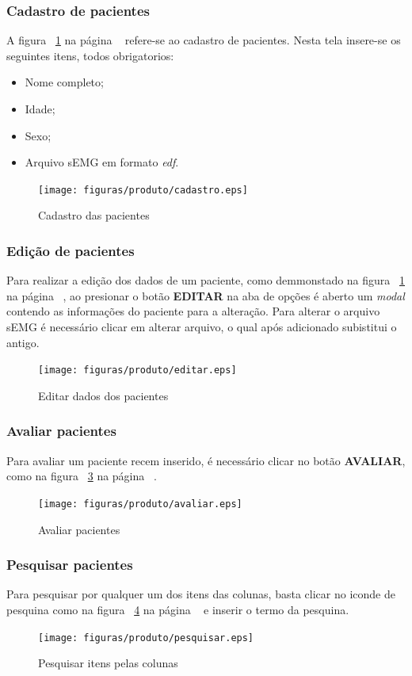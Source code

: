 \subsubsection{Cadastro de pacientes}
A figura ~\ref{figcadastro} na página ~\pageref{figcadastro} refere-se ao cadastro de pacientes. Nesta tela insere-se os seguintes itens, todos obrigatorios:
\begin{itemize}
	\item Nome completo;
	\item Idade;
	\item Sexo;
	\item Arquivo sEMG em formato \textit{edf}.
\end{itemize}

\begin{figure}[!htb]
	\centering
	\texttt{[image: figuras/produto/cadastro.eps]}
	\caption{Cadastro das pacientes}
	\label{figcadastro}
\end{figure}

\subsubsection{Edição de pacientes}
Para realizar a edição dos dados de um paciente, como demmonstado na figura ~\ref{figcadastro} na página ~\pageref{figcadastro}, ao presionar o botão \textbf{EDITAR} na aba de opções é aberto um \textit{modal} contendo as informações do paciente para a alteração. Para alterar o arquivo sEMG é necessário clicar em alterar arquivo, o qual após adicionado subistitui o antigo.

\begin{figure}[!htb]
	\centering
	\texttt{[image: figuras/produto/editar.eps]}
	\caption{Editar dados dos pacientes}
	\label{figeditar}
\end{figure}

\subsubsection{Avaliar pacientes}
Para avaliar um paciente recem inserido, é necessário clicar no botão \textbf{AVALIAR}, como na figura ~\ref{figavaliar} na página ~\pageref{figavaliar}.
\begin{figure}[!htb]
	\centering
	\texttt{[image: figuras/produto/avaliar.eps]}
	\caption{Avaliar pacientes}
	\label{figavaliar}
\end{figure}

\subsubsection{Pesquisar pacientes}
Para pesquisar por qualquer um dos itens das colunas, basta clicar no iconde de pesquina como na figura ~\ref{figpesquisar} na página ~\pageref{figpesquisar} e inserir o termo da pesquina.
\begin{figure}[!htb]
	\centering
	\texttt{[image: figuras/produto/pesquisar.eps]}
	\caption{Pesquisar itens pelas colunas}
	\label{figpesquisar}
\end{figure}

